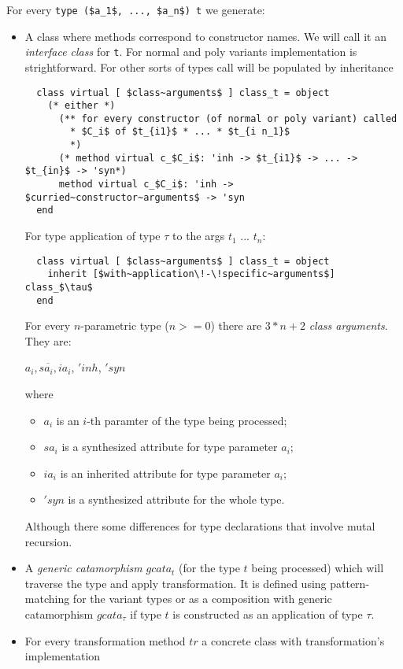 \documentclass[acmsmall,review,anonymous]{acmart}\settopmatter{printfolios=true,printccs=false,printacmref=false}
\begin{document}
For every \lstinline{type ($a_1$, ..., $a_n$) t} we generate:
\begin{itemize}
  \item A class where methods correspond to constructor names. We will call it an \textit{interface class} for \lstinline{t}. For normal and poly variants implementation is strightforward. For other sorts of types call will be populated by inheritance
  \begin{lstlisting}
  class virtual [ $class~arguments$ ] class_t = object
    (* either *)
      (** for every constructor (of normal or poly variant) called
        * $C_i$ of $t_{i1}$ * ... * $t_{i n_1}$
        *)
      (* method virtual c_$C_i$: 'inh -> $t_{i1}$ -> ... ->  $t_{in}$ -> 'syn*)
      method virtual c_$C_i$: 'inh -> $curried~constructor~arguments$ -> 'syn
  end
  \end{lstlisting}
  For type application of type $\tau$ to the args $t_1$ ... $t_n$: 
  \begin{lstlisting}
  class virtual [ $class~arguments$ ] class_t = object
    inherit [$with~application\!-\!specific~arguments$] class_$\tau$
  end
  \end{lstlisting}

  For every $n$-parametric type ($n>=0$) there are $3*n+2$ \textit{class arguments}. They are:
    \begin{center}
        $\overline{a_i, sa_i, ia_i}$, $'inh$, $'syn$
    \end{center}
  where \begin{itemize}
          \item $a_i$ is an $i$-th paramter of the type being processed;
          \item $sa_i$ is a synthesized attribute for type parameter $a_i$;
          \item $ia_i$ is an inherited attribute for type parameter $a_i$;
          \item $'syn$ is a synthesized attribute for the whole type.
  \end{itemize}
  
  Although there some differences for type declarations that involve mutal recursion.
  
  \item A \textit{generic catamorphism} $gcata_t$ (for the type $t$ being processed) which will traverse the type and apply transformation. It is defined using pattern-matching for the variant types or as a composition with generic catamorphism $gcata_\tau$ if type $t$ is constructed as an application of type $\tau$.
  \item For every transformation method $tr$ a concrete class with transformation's implementation


\end{itemize}
\end{document}
